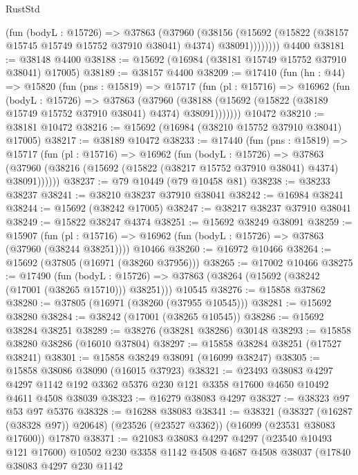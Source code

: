 \begin{lexlean}{RustStd}
\begin{coremodule}
            (fun (bodyL : @15726) =>
            @37863
              (@37960
                (@38156
                  (@15692 (@15822 (@38157 @15745 @15749 @15752 @37910 @38041) @4374) @38091))))))))
    @4400
@38181 := @38148 @4400
@38188 := @15692 (@16984 (@38181 @15749 @15752 @37910 @38041) @17005)
@38189 := @38157 @4400
@38209 := @17410
    (fun (hn : @44) =>
    @15820
      (fun (pns : @15819) =>
      @15717
        (fun (pl : @15716) =>
        @16962
          (fun (bodyL : @15726) =>
          @37863
            (@37960
              (@38188 (@15692 (@15822 (@38189 @15749 @15752 @37910 @38041) @4374) @38091)))))))
    @10472
@38210 := @38181 @10472
@38216 := @15692 (@16984 (@38210 @15752 @37910 @38041) @17005)
@38217 := @38189 @10472
@38233 := @17440
    (fun (pns : @15819) =>
    @15717
      (fun (pl : @15716) =>
      @16962
        (fun (bodyL : @15726) =>
        @37863 (@37960 (@38216 (@15692 (@15822 (@38217 @15752 @37910 @38041) @4374) @38091))))))
@38237 := @79 @10449 (@79 @10458 @81)
@38238 := @38233 @38237
@38241 := @38210 @38237 @37910 @38041
@38242 := @16984 @38241
@38244 := @15692 (@38242 @17005)
@38247 := @38217 @38237 @37910 @38041
@38249 := @15822 @38247 @4374
@38251 := @15692 @38249 @38091
@38259 := @15907
    (fun (pl : @15716) => @16962 (fun (bodyL : @15726) => @37863 (@37960 (@38244 @38251))))
    @10466
@38260 := @16972 @10466
@38264 := @15692 (@37805 (@16971 (@38260 @37956)))
@38265 := @17002 @10466
@38275 := @17490
    (fun (bodyL : @15726) => @37863 (@38264 (@15692 (@38242 (@17001 (@38265 @15710))) @38251)))
    @10545
@38276 := @15858 @37862
@38280 := @37805 (@16971 (@38260 (@37955 @10545)))
@38281 := @15692 @38280
@38284 := @38242 (@17001 (@38265 @10545))
@38286 := @15692 @38284 @38251
@38289 := @38276 (@38281 @38286) @30148
@38293 := @15858 @38280 @38286 (@16010 @37804)
@38297 := @15858 @38284 @38251 (@17527 @38241)
@38301 := @15858 @38249 @38091 (@16099 @38247)
@38305 := @15858 @38086 @38090 (@16015 @37923)
@38321 := @23493
    @38083
    @4297
    @4297
    @1142
    @192
    @3362
    @5376
    @230
    @121
    @3358
    @17600
    @4650
    @10492
    @4611
    @4508
    @38039
@38323 := @16279 @38083 @4297
@38327 := @38323 @97 @53 @97 @5376
@38328 := @16288 @38083
@38341 := @38321
    (@38327 (@16287 (@38328 @97)) @20648)
    (@23526 (@23527 @3362))
    (@16099 (@23531 @38083 @17600))
    @17870
@38371 := @21083
    @38083
    @4297
    @4297
    (@23540 @10493 @121 @17600)
    @10502
    @230
    @3358
    @1142
    @4508
    @4687
    @4508
    @38037
    (@17840
      @38083
      @4297
      @230
      @1142

\end{coremodule}
\end{lexlean}
